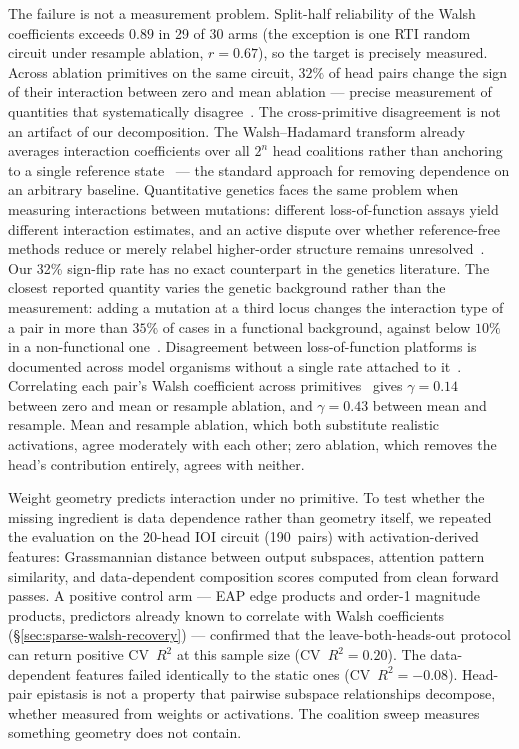 \documentclass{article}
\begin{document}
The failure is not a measurement problem. Split-half reliability of the Walsh
coefficients exceeds $0.89$ in 29 of 30 arms (the exception is one RTI random
circuit under resample ablation, $r = 0.67$), so the target is precisely
measured. Across ablation primitives on the same circuit, $32\%$ of head pairs
change the sign of their interaction between zero and mean ablation --- precise
measurement of quantities that systematically
disagree~\citep{housden2017comparison}.
The cross-primitive disagreement is not an artifact of our decomposition.
The Walsh--Hadamard transform already averages interaction coefficients over
all $2^n$ head coalitions rather than anchoring to a single reference
state~\citep{poelwijk2016context,poelwijk2019learning} --- the standard
approach for removing dependence on an arbitrary baseline. Quantitative
genetics faces the same problem when measuring interactions between mutations:
different loss-of-function assays yield different interaction estimates, and an
active dispute over whether reference-free methods reduce or merely relabel
higher-order structure remains
unresolved~\citep{park2024simplicity,dupic2024protein,buda2024higher}. Our
32\% sign-flip rate has no exact counterpart in the genetics literature.
The closest reported quantity varies the genetic background rather than
the measurement: adding a mutation at a third locus changes the
interaction type of a pair in more than $35\%$ of cases in a functional
background, against below $10\%$ in a non-functional
one~\citep{fluidity2024elife}. Disagreement between loss-of-function
platforms is documented across model organisms without a single rate
attached to it~\citep{housden2017comparison}. Correlating each
pair's Walsh coefficient across primitives~\citep{ferretti2016measuring} gives
$\gamma = 0.14$ between zero and mean or resample ablation, and $\gamma = 0.43$
between mean and resample. Mean and resample ablation, which both substitute
realistic activations, agree moderately with each other; zero ablation, which
removes the head's contribution entirely, agrees with neither.

Weight geometry predicts interaction under no primitive.
To test whether the missing ingredient is data dependence rather than geometry
itself, we repeated the evaluation on the 20-head IOI circuit (190~pairs) with
activation-derived features: Grassmannian distance between output subspaces,
attention pattern similarity, and data-dependent composition scores computed
from clean forward passes. A positive control arm --- EAP edge products and
order-1 magnitude products, predictors already known to correlate with Walsh
coefficients (\S\ref{sec:sparse-walsh-recovery}) --- confirmed that the
leave-both-heads-out protocol can return positive CV~$R^2$ at this sample size
(CV~$R^2 = 0.20$). The data-dependent features failed identically to the
static ones (CV~$R^2 = {-}0.08$). Head-pair epistasis is not a property that
pairwise subspace relationships decompose, whether measured from weights or
activations. The coalition sweep measures something geometry does not contain.
\end{document}
